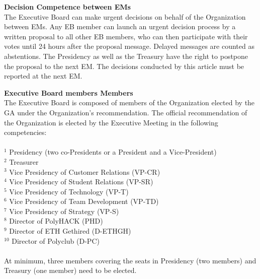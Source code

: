 \documentclass[10pt]{article}
\newcounter{qcounter}
\begin{document}
\begin{list}{{\bf Article :~}}{}
\item {\bf Decision Competence between EMs}\\
The Executive Board can make urgent decisions on behalf of the Organization between EMs. Any EB member can launch an urgent decision process by a written proposal to all other EB members, who can then participate with their votes until 24 hours after the proposal message. Delayed messages are counted as abstentions. The Presidency as well as the Treasury have the right to postpone the proposal to the next EM. The decisions conducted by this article must be reported at the next EM.


\item {\bf Executive Board members Members}\\
The Executive Board is composed of members of the Organization elected by the GA under the Organization's recommendation. The official recommendation of the Organization is elected by the Executive Meeting in the following competencies:\\ \\
$^{1}$ Presidency (two co-Presidents or a President and a Vice-President)\\
$^{2}$ Treasurer\\
$^{3}$ Vice Presidency of Customer Relations (VP-CR)\\
$^{4}$ Vice Presidency of Student Relations (VP-SR)\\
$^{5}$ Vice Presidency of Technology (VP-T)\\
$^{6}$ Vice Presidency of Team Development (VP-TD)\\
$^{7}$ Vice Presidency of Strategy (VP-S)\\
$^{8}$ Director of PolyHACK (PHD)\\
$^{9}$ Director of ETH Gethired (D-ETHGH)\\
$^{10}$ Director of Polyclub (D-PC)\\\\
At minimum, three members covering the seats in Presidency (two members) and Treasury (one member) need to be elected. 


\end{list}
\end{document}
